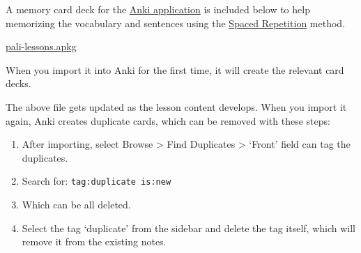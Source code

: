 A memory card deck for the \href{https://apps.ankiweb.net/}{Anki
application} is included below to help memorizing the vocabulary and
sentences using the \href{https://gwern.net/spaced-repetition}{Spaced
Repetition} method.

\href{./includes/docs/pali-lessons.apkg}{pali-lessons.apkg}

When you import it into Anki for the first time, it will create the
relevant card decks.

The above file gets updated as the lesson content develops. When you
import it again, Anki creates duplicate cards, which can be removed with
these steps:

\begin{enumerate}
\def\labelenumi{\arabic{enumi}.}
\tightlist
\item
  After importing, select Browse \textgreater{} Find Duplicates
  \textgreater{} `Front' field can tag the duplicates.
\item
  Search for: \texttt{tag:duplicate\ is:new}
\item
  Which can be all deleted.
\item
  Select the tag `duplicate' from the sidebar and delete the tag itself,
  which will remove it from the existing notes.
\end{enumerate}

